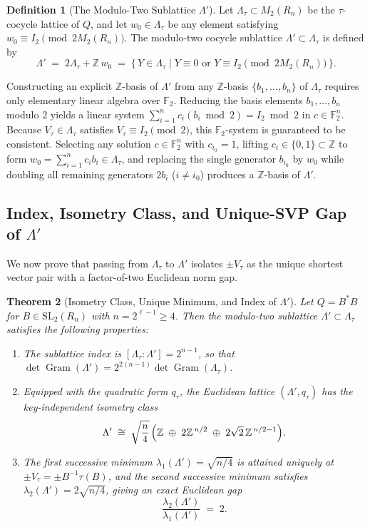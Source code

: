 \documentclass[11pt,a4paper]{article}
\newtheorem{theorem}{Theorem}
\theoremstyle{definition}
\newtheorem{definition}[theorem]{Definition}
\newcommand{\Z}{\mathbb{Z}}
\newcommand{\F}{\mathbb{F}}
\newcommand{\Lt}{\Lambda_\tau}
\newcommand{\Lp}{\Lambda'}
\newcommand{\Vt}{V_\tau}
\newcommand{\Gram}{\operatorname{Gram}}
\begin{document}
\begin{definition}[The Modulo-Two Sublattice $\Lp$]\label{def:lp}
Let $\Lt \subset M_2(R_n)$ be the $\tau$-cocycle lattice of $Q$, and let $w_0 \in \Lt$ be any element satisfying $w_0 \equiv I_2 \pmod{2M_2(R_n)}$. The modulo-two cocycle sublattice $\Lp \subset \Lt$ is defined by
\begin{equation}\label{eq:lp-def}
  \Lp \;=\; 2\Lt + \Z\,w_0 \;=\; \bigl\{\, Y \in \Lt \;\big|\; Y \equiv 0 \text{ or } Y \equiv I_2 \pmod{2M_2(R_n)} \,\bigr\}.
\end{equation}
\end{definition}

Constructing an explicit $\Z$-basis of $\Lp$ from any $\Z$-basis $\{b_1, \dots, b_n\}$ of $\Lt$ requires only elementary linear algebra over $\F_2$. Reducing the basis elements $b_1, \dots, b_n$ modulo $2$ yields a linear system $\sum_{i=1}^n c_i (b_i \bmod 2) = I_2 \bmod 2$ in $c \in \F_2^n$. Because $\Vt \in \Lt$ satisfies $\Vt \equiv I_2 \pmod 2$, this $\F_2$-system is guaranteed to be consistent. Selecting any solution $c \in \F_2^n$ with $c_{i_0} = 1$, lifting $c_i \in \{0,1\} \subset \Z$ to form $w_0 = \sum_{i=1}^n c_i b_i \in \Lt$, and replacing the single generator $b_{i_0}$ by $w_0$ while doubling all remaining generators $2b_i$ ($i \ne i_0$) produces a $\Z$-basis of $\Lp$.

\subsection{Index, Isometry Class, and Unique-SVP Gap of \texorpdfstring{$\Lp$}{Lambda'}}
We now prove that passing from $\Lt$ to $\Lp$ isolates $\pm\Vt$ as the unique shortest vector pair with a factor-of-two Euclidean norm gap.

\begin{theorem}[Isometry Class, Unique Minimum, and Index of $\Lp$]\label{thm:lp-isom}
Let $Q = B^*B$ for $B \in \mathrm{SL}_2(R_n)$ with $n = 2^{\ell-1} \ge 4$. Then the modulo-two sublattice $\Lp \subset \Lt$ satisfies the following properties:
\begin{enumerate}[label=(\roman*),leftmargin=*]
\item The sublattice index is $[\Lt : \Lp] = 2^{n-1}$, so that $\det \Gram(\Lp) = 2^{2(n-1)} \det \Gram(\Lt)$.
\item Equipped with the quadratic form $q_\tau$, the Euclidean lattice $(\Lp, q_\tau)$ has the key-independent isometry class
\begin{equation}\label{eq:lp-decomp}
  \Lp \;\cong\; \sqrt{\frac{n}{4}}\,\Bigl(\Z \;\oplus\; 2\Z^{\,n/2} \;\oplus\; 2\sqrt{2}\,\Z^{\,n/2-1}\Bigr).
\end{equation}
\item The first successive minimum $\lambda_1(\Lp) = \sqrt{n/4}$ is attained \emph{uniquely} at $\pm\Vt = \pm B^{-1}\tau(B)$, and the second successive minimum satisfies $\lambda_2(\Lp) = 2\sqrt{n/4}$, giving an exact Euclidean gap
\begin{equation}\label{eq:lp-gap}
  \frac{\lambda_2(\Lp)}{\lambda_1(\Lp)} \;=\; 2.
\end{equation}
\end{enumerate}
\end{theorem}
\end{document}
